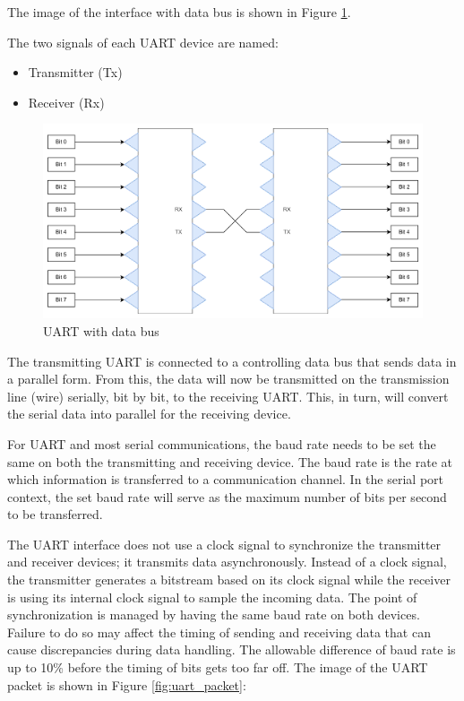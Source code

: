 \documentclass[a4paper,12pt]{report}
\begin{document}
The image of the interface with data bus is shown in Figure \ref{fig:uart_interface_data_bus}.

The two signals of each UART device are named:

\begin{itemize}
  \item Transmitter (Tx)
  \item Receiver (Rx)
\end{itemize}

\begin{figure}
  \begin{center}
    \includegraphics[clip, keepaspectratio, width=0.5\linewidth]{img/uart_interface_data_bus.png}
    \caption{UART with data bus}
    \label{fig:uart_interface_data_bus}
  \end{center}
\end{figure}

The transmitting UART is connected to a controlling data bus that
sends data in a parallel form.
From this,
the data will now be transmitted on the transmission line (wire) serially,
bit by bit, to the receiving UART.
This, in turn,
will convert the serial data into parallel for the receiving device.

For UART and most serial communications,
the baud rate needs to be set the same on both
the transmitting and receiving device.
The baud rate is the rate at which information is transferred
to a communication channel.
In the serial port context,
the set baud rate will serve as the maximum number of
bits per second to be transferred.

The UART interface does not use a clock signal to
synchronize the transmitter and receiver devices;
it transmits data asynchronously.
Instead of a clock signal,
the transmitter generates a bitstream based on its clock signal
while the receiver is using its internal clock signal
to sample the incoming data.
The point of synchronization is managed by having the same baud rate
on both devices.
Failure to do so may affect the timing of sending and receiving
data that can cause discrepancies during data handling.
The allowable difference of baud rate is up to 10\%
before the timing of bits gets too far off.
The image of the UART packet is shown in Figure \ref{fig:uart_packet}:
\end{document}
